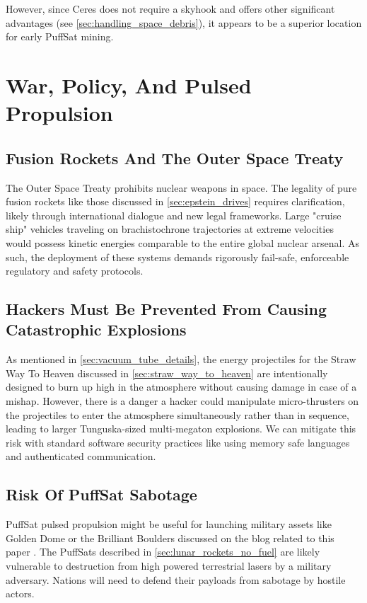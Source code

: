 \documentclass{article}
\begin{document}
However, since Ceres does not require a skyhook and offers other significant advantages (see \autoref{sec:handling_space_debris}), it appears to be a superior location for early PuffSat mining.


\section{War, Policy, And Pulsed Propulsion}
\subsection{Fusion Rockets And The Outer Space Treaty}
The Outer Space Treaty \cite{outer_space_treaty} prohibits nuclear weapons in space. The legality of pure fusion rockets like those discussed in \autoref{sec:epstein_drives} requires clarification, likely through international dialogue and new legal frameworks.  Large "cruise ship" vehicles traveling on brachistochrone trajectories at extreme velocities would possess kinetic energies comparable to the entire global nuclear arsenal. As such, the deployment of these systems demands rigorously fail-safe, enforceable regulatory and safety protocols.

\subsection{Hackers Must Be Prevented From Causing Catastrophic Explosions}
As mentioned in \autoref{sec:vacuum_tube_details}, the energy projectiles for the Straw Way To Heaven discussed in \autoref{sec:straw_way_to_heaven} are intentionally designed to burn up high in the atmosphere without causing damage in case of a mishap.  However, there is a danger a hacker could manipulate micro-thrusters on the projectiles to enter the atmosphere simultaneously rather than in sequence, leading to larger Tunguska-sized \cite{longo2007tunguska}  multi-megaton explosions.  We can mitigate this risk with standard software security practices like using memory safe languages and authenticated communication.

\subsection{Risk Of PuffSat Sabotage}
PuffSat pulsed propulsion might be useful for launching military assets like Golden Dome \cite{lockheed_martin_golden_dome} or the Brilliant Boulders \cite{brilliant_boulders} discussed on the blog related to this paper \cite{aim2024}.   The PuffSats described in \autoref{sec:lunar_rockets_no_fuel} are likely vulnerable to destruction from high powered terrestrial lasers by a military adversary.  Nations will need to defend their payloads from sabotage by hostile actors.
\end{document}
